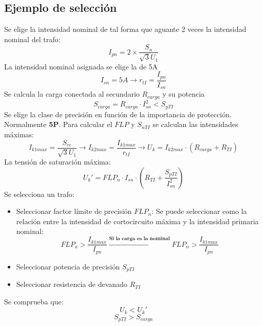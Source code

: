\subsection{Ejemplo de selección}
Se elige la intensidad nominal de tal forma que aguante 2 veces la intensidad nominal del trafo:
\begin{equation}
	I_{pn}=2\times\dfrac{S_n}{\sqrt{3}U_1}
\end{equation}
La intensidad nominal asignada se elige la de 5A
\begin{equation}
	I_{sn}=5A \rightarrow r_{tI}=\dfrac{I_{pn}}{I_{sn}}
\end{equation}
Se calcula la carga conectada al secundario $R_{carga}$ y su potencia
\begin{equation}
	S_{carga}=R_{carga}\cdot I^2_{sn} < S_{pTI}
\end{equation}
Se elige la clase de precisión en función de la importancia de protección. Normalmente \textbf{5P}.
\newline
Para calcular el $FLP$ y $S_{nTI}$ se calculan las intensidades máximas:
\begin{equation}
	I_{k1max}=\dfrac{S_{cc}}{\sqrt{3}U_1}\rightarrow I_{k2max}=\dfrac{I_{k1max}}{r_{tI}} \rightarrow U_k=I_{k2max}\cdot (R_{carga} +R_{TI})
\end{equation}
La tensión de saturación máxima:
\begin{equation}
	U_k'=FLP_n\cdot I_{sn} \cdot \left(R_{TI}+\dfrac{S_{pTI}}{I_{sn}^2}\right)
\end{equation}
Se selecciona un trafo:
\begin{itemize}
	\item Seleccionar factor límite de precisión $FLP_n$: Se puede seleccionar como la relación entre la intensidad de cortocircuito máxima y la intensidad primaria nominal:
	\begin{equation}
		FLP_a> \dfrac{I_{k1max}}{I_{pn}} \xrightarrow{\textbf{Si la carga es la nominal}} FLP_n> \dfrac{I_{k1max}}{I_{pn}}
	\end{equation}
	\item Seleccionar potencia de precisión $S_{pTI}$
	\item Seleccionar resistencia de devanado $R_{TI} $
\end{itemize}
Se comprueba que:
\begin{equation}
	U_k< U_k'
\end{equation}
\begin{equation}
	S_{pTI}>S_{carga}
\end{equation}
